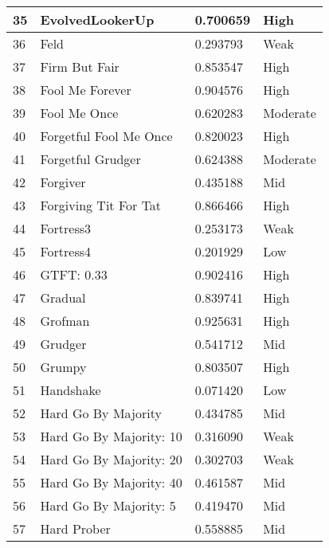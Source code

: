 \begin{longtable}{|p{0.5cm}||p{6cm}||p{4cm}||p{2cm}|}
			35  & EvolvedLookerUp             & 0.700659          & High \\ \hline
			36  & Feld                        & 0.293793          & Weak     \\ \hline
			37  & Firm But Fair               & 0.853547          & High     \\ \hline
			38  & Fool Me Forever             & 0.904576          & High     \\ \hline
			39  & Fool Me Once                & 0.620283          & Moderate \\ \hline
			40  & Forgetful Fool Me Once      & 0.820023          & High     \\ \hline
			41  & Forgetful Grudger           & 0.624388          & Moderate \\ \hline
			42  & Forgiver                    & 0.435188          & Mid     \\ \hline
			43  & Forgiving Tit For Tat       & 0.866466          & High     \\ \hline
			44  & Fortress3                   & 0.253173          & Weak     \\ \hline
			45  & Fortress4                   & 0.201929          & Low      \\ \hline
			46  & GTFT: 0.33                  & 0.902416          & High     \\ \hline
			47  & Gradual                     & 0.839741          & High     \\ \hline
			48  & Grofman                     & 0.925631          & High     \\ \hline
			49  & Grudger                     & 0.541712          & Mid     \\ \hline
			50  & Grumpy                      & 0.803507          & High     \\ \hline
			51  & Handshake                   & 0.071420          & Low      \\ \hline
			52  & Hard Go By Majority         & 0.434785          & Mid     \\ \hline
			53  & Hard Go By Majority: 10     & 0.316090          & Weak     \\ \hline
			54  & Hard Go By Majority: 20     & 0.302703          & Weak     \\ \hline
			55  & Hard Go By Majority: 40     & 0.461587          & Mid     \\ \hline
			56  & Hard Go By Majority: 5      & 0.419470          & Mid     \\ \hline
			57  & Hard Prober                 & 0.558885          & Mid     \\ \hline

\end{longtable}
